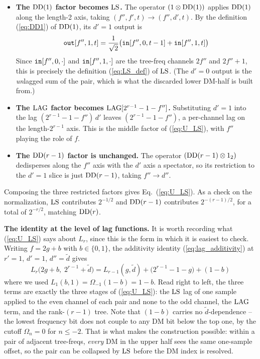 \documentclass{article}
\numberwithin{equation}{section}   %
\def\DD{{\rm DD}}
\def\LS{{\rm LS}}
\def\LAG{{\rm LAG}}
\begin{document}
\begin{itemize}

\item {\bf The $\DD(1)$ factor becomes $\LS$.} The operator $(1 \otimes \DD(1))$ applies
$\DD(1)$ along the length-2 axis, taking $(f'',f',t) \to (f'',d',t)$. By the definition
(\ref{eq:DD1}) of $\DD(1)$, its $d'=1$ output is
\begin{equation}
{\tt out}[f'',1,t] = \frac{1}{\sqrt 2} \big( {\tt in}[f'',0,t-1] + {\tt in}[f'',1,t] \big)
\end{equation}
Since ${\tt in}[f'',0,\cdot]$ and ${\tt in}[f'',1,\cdot]$ are the tree-freq channels $2f''$ and
$2f''+1$, this is precisely the definition (\ref{eq:LS_def}) of $\LS$. (The $d'=0$ output is
the {\em un}lagged sum of the pair, which is what the discarded lower DM-half is built from.)

\item {\bf The $\LAG$ factor becomes $\LAG[2^{r-1}-1-f'']$.} Substituting $d'=1$ into the lag
$(2^{r-1}-1-f'')\,d'$ leaves $(2^{r-1}-1-f'')$, a per-channel lag on the length-$2^{r-1}$ axis.
This is the middle factor of (\ref{eq:U_LS}), with $f''$ playing the role of $f$.

\item {\bf The $\DD(r-1)$ factor is unchanged.} The operator $(\DD(r-1) \otimes 1_2)$ dedisperses
along the $f''$ axis with the $d'$ axis a spectator, so its restriction to the $d'=1$ slice is
just $\DD(r-1)$, taking $f'' \to d''$.

\end{itemize}

\par\noindent
Composing the three restricted factors gives Eq.\ (\ref{eq:U_LS}). As a check on the
normalization, $\LS$ contributes $2^{-1/2}$ and $\DD(r-1)$ contributes $2^{-(r-1)/2}$, for a
total of $2^{-r/2}$, matching $\DD(r)$.

\par\noindent
{\bf The identity at the level of lag functions.} It is worth recording what
(\ref{eq:U_LS}) says about $L_r$, since this is the form in which it is easiest to check.
Writing $f = 2g+b$ with $b \in \{0,1\}$, the additivity identity (\ref{eq:lag_additivity})
at $r'=1$, $d'=1$, $d''=\tilde d$ gives
\begin{equation}
L_r\big(2g+b,\; 2^{r-1}+\tilde d\big)
  = L_{r-1}(g, \tilde d) + \big(2^{r-1}-1-g\big) + (1-b)
\label{eq:uh_lag}
\end{equation}
where we used $L_1(b,1) = \Omega_{-1}(1-b) = 1-b$. Read right to left, the three terms are
exactly the three stages of (\ref{eq:U_LS}): the $\LS$ lag of one sample applied to the even
channel of each pair and none to the odd channel, the $\LAG$ term, and the rank-$(r-1)$ tree.
Note that $(1-b)$ carries no $\tilde d$-dependence -- the lowest frequency bit does not couple
to any DM bit below the top one, by the cutoff $\Omega_n = 0$ for $n \le -2$. That is what makes
the construction possible: within a pair of adjacent tree-freqs, {\em every} DM in the upper half
sees the same one-sample offset, so the pair can be collapsed by $\LS$ before the DM index is
resolved.

\clearpage
\end{document}
